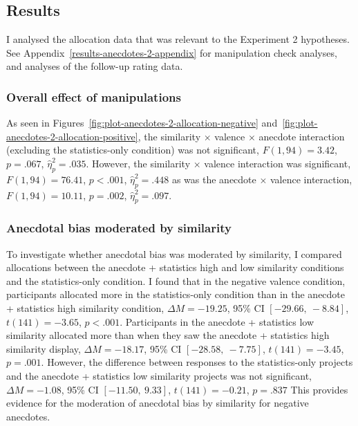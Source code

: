 \documentclass[a4paper, nobind, dvipsnames]{templates/ociamthesis}
\theoremstyle{definition}
\theoremstyle{definition}
\theoremstyle{definition}
\theoremstyle{definition}
\theoremstyle{remark}
\begin{document}
\hypertarget{results-3}{%
\subsection{Results}\label{results-3}}

I analysed the allocation data that was relevant to the Experiment 2 hypotheses.
See Appendix~\ref{results-anecdotes-2-appendix} for manipulation check
analyses, and analyses of the follow-up rating data.

\hypertarget{overall-effect-of-manipulations}{%
\subsubsection{Overall effect of manipulations}\label{overall-effect-of-manipulations}}

As seen in Figures~\ref{fig:plot-anecdotes-2-allocation-negative}
and~\ref{fig:plot-anecdotes-2-allocation-positive}, the similarity \(\times\)
valence \(\times\) anecdote interaction (excluding the statistics-only condition)
was not significant,
\(F(1, 94) = 3.42\), \(p = .067\), \(\hat{\eta}^2_p = .035\).
However, the similarity \(\times\) valence interaction was significant,
\(F(1, 94) = 76.41\), \(p < .001\), \(\hat{\eta}^2_p = .448\) as was the anecdote \(\times\) valence
interaction, \(F(1, 94) = 10.11\), \(p = .002\), \(\hat{\eta}^2_p = .097\).

\hypertarget{anecdotal-bias-moderated-by-similarity}{%
\subsubsection{Anecdotal bias moderated by similarity}\label{anecdotal-bias-moderated-by-similarity}}

To investigate whether anecdotal bias was moderated by similarity, I compared
allocations between the anecdote + statistics high and low similarity conditions and the
statistics-only condition. I found that in the negative valence condition,
participants allocated more in the statistics-only condition than in the
anecdote + statistics high similarity condition,
\(\Delta M = -19.25\), 95\% CI \([-29.66,~-8.84]\), \(t(141) = -3.65\), \(p < .001\).
Participants in the anecdote + statistics low similarity allocated more than when they saw
the anecdote + statistics high similarity display,
\(\Delta M = -18.17\), 95\% CI \([-28.58,~-7.75]\), \(t(141) = -3.45\), \(p = .001\).
However, the difference between responses to the statistics-only projects and
the anecdote + statistics low similarity projects was not significant,
\(\Delta M = -1.08\), 95\% CI \([-11.50,~9.33]\), \(t(141) = -0.21\), \(p = .837\)
This provides evidence for the moderation of anecdotal bias by similarity for
negative anecdotes.
\end{document}
